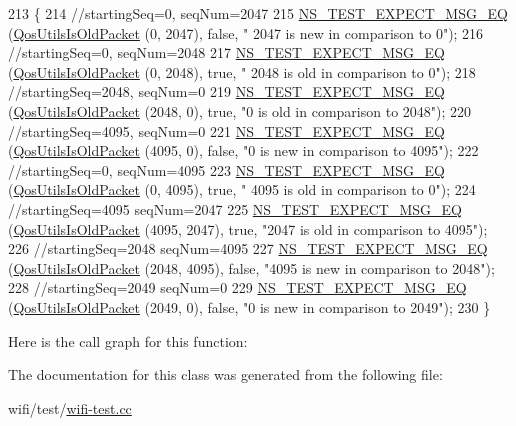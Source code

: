 \begin{DoxyCode}
213   \{
214     \textcolor{comment}{//startingSeq=0, seqNum=2047}
215     \hyperlink{group__testing_ga7304ba46a28d8cf08dfdfd6499cf7068}{NS\_TEST\_EXPECT\_MSG\_EQ} (\hyperlink{group__wifi_ga5cb9ea723837c5a036e622612f2d0bb0}{QosUtilsIsOldPacket} (0, 2047), \textcolor{keyword}{false}, \textcolor{stringliteral}{"
      2047 is new in comparison to 0"});
216     \textcolor{comment}{//startingSeq=0, seqNum=2048}
217     \hyperlink{group__testing_ga7304ba46a28d8cf08dfdfd6499cf7068}{NS\_TEST\_EXPECT\_MSG\_EQ} (\hyperlink{group__wifi_ga5cb9ea723837c5a036e622612f2d0bb0}{QosUtilsIsOldPacket} (0, 2048), \textcolor{keyword}{true}, \textcolor{stringliteral}{"
      2048 is old in comparison to 0"});
218     \textcolor{comment}{//startingSeq=2048, seqNum=0}
219     \hyperlink{group__testing_ga7304ba46a28d8cf08dfdfd6499cf7068}{NS\_TEST\_EXPECT\_MSG\_EQ} (\hyperlink{group__wifi_ga5cb9ea723837c5a036e622612f2d0bb0}{QosUtilsIsOldPacket} (2048, 0), \textcolor{keyword}{true}, \textcolor{stringliteral}{"0
       is old in comparison to 2048"});
220     \textcolor{comment}{//startingSeq=4095, seqNum=0}
221     \hyperlink{group__testing_ga7304ba46a28d8cf08dfdfd6499cf7068}{NS\_TEST\_EXPECT\_MSG\_EQ} (\hyperlink{group__wifi_ga5cb9ea723837c5a036e622612f2d0bb0}{QosUtilsIsOldPacket} (4095, 0), \textcolor{keyword}{false}, \textcolor{stringliteral}{"0
       is new in comparison to 4095"});
222     \textcolor{comment}{//startingSeq=0, seqNum=4095}
223     \hyperlink{group__testing_ga7304ba46a28d8cf08dfdfd6499cf7068}{NS\_TEST\_EXPECT\_MSG\_EQ} (\hyperlink{group__wifi_ga5cb9ea723837c5a036e622612f2d0bb0}{QosUtilsIsOldPacket} (0, 4095), \textcolor{keyword}{true}, \textcolor{stringliteral}{"
      4095 is old in comparison to 0"});
224     \textcolor{comment}{//startingSeq=4095 seqNum=2047}
225     \hyperlink{group__testing_ga7304ba46a28d8cf08dfdfd6499cf7068}{NS\_TEST\_EXPECT\_MSG\_EQ} (\hyperlink{group__wifi_ga5cb9ea723837c5a036e622612f2d0bb0}{QosUtilsIsOldPacket} (4095, 2047), \textcolor{keyword}{true}, \textcolor{stringliteral}{
      "2047 is old in comparison to 4095"});
226     \textcolor{comment}{//startingSeq=2048 seqNum=4095}
227     \hyperlink{group__testing_ga7304ba46a28d8cf08dfdfd6499cf7068}{NS\_TEST\_EXPECT\_MSG\_EQ} (\hyperlink{group__wifi_ga5cb9ea723837c5a036e622612f2d0bb0}{QosUtilsIsOldPacket} (2048, 4095), \textcolor{keyword}{false},
       \textcolor{stringliteral}{"4095 is new in comparison to 2048"});
228     \textcolor{comment}{//startingSeq=2049 seqNum=0}
229     \hyperlink{group__testing_ga7304ba46a28d8cf08dfdfd6499cf7068}{NS\_TEST\_EXPECT\_MSG\_EQ} (\hyperlink{group__wifi_ga5cb9ea723837c5a036e622612f2d0bb0}{QosUtilsIsOldPacket} (2049, 0), \textcolor{keyword}{false}, \textcolor{stringliteral}{"0
       is new in comparison to 2049"});
230   \}
\end{DoxyCode}


Here is the call graph for this function\+:




The documentation for this class was generated from the following file\+:\begin{DoxyCompactItemize}
\item 
wifi/test/\hyperlink{wifi-test_8cc}{wifi-\/test.\+cc}\end{DoxyCompactItemize}
